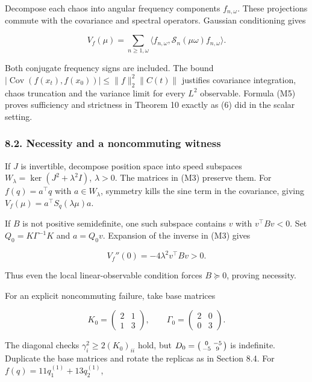 \documentclass[
  british,
  11pt,
  a4paper,
]{article}
\begin{document}
Decompose each chaos into angular frequency components \(f_{n,\omega}\).
These projections commute with the covariance and spectral operators.
Gaussian conditioning gives

\[
V_f(\mu)=\sum_{n\ge1,\omega}
\langle f_{n,\omega},\mathcal S_n(\mu\omega)f_{n,\omega}\rangle. \tag{M5}
\]

Both conjugate frequency signs are included. The bound
\(|\mathop{\mathrm{Cov}}(f(x_t),f(x_0))|\le\|f\|_2^2\|C(t)\|\) justifies
covariance integration, chaos truncation and the variance limit for
every \(L^2\) observable. Formula (M5) proves sufficiency and strictness
in Theorem 10 exactly as (6) did in the scalar setting.

\subsubsection{8.2. Necessity and a noncommuting
witness}\label{necessity-and-a-noncommuting-witness}

If \(J\) is invertible, decompose position space into speed subspaces
\(W_\lambda=\ker(J^2+\lambda^2I)\), \(\lambda>0\). The matrices in (M3)
preserve them. For \(f(q)=a^\top q\) with \(a\in W_\lambda\), symmetry
kills the sine term in the covariance, giving
\(V_f(\mu)=a^\top S_q(\lambda\mu)a\).

If \(B\) is not positive semidefinite, one such subspace contains \(v\)
with \(v^\top Bv<0\). Set \(Q_0=K\Gamma^{-1}K\) and \(a=Q_0v\).
Expansion of the inverse in (M3) gives

\[
V_f''(0)=-4\lambda^2v^\top Bv>0.
\]

Thus even the local linear-observable condition forces \(B\succeq0\),
proving necessity.

For an explicit noncommuting failure, take base matrices

\[
K_0=\begin{pmatrix}2&1\\1&3\end{pmatrix},\qquad
\Gamma_0=\begin{pmatrix}2&0\\0&3\end{pmatrix}.
\]

The diagonal checks \(\gamma_i^2\ge2(K_0)_{ii}\) hold, but
\(D_0=\begin{psmallmatrix}0&-5\\-5&9\end{psmallmatrix}\) is indefinite.
Duplicate the base matrices and rotate the replicas as in Section 8.4.
For \(f(q)=11q^{(1)}_1+13q^{(1)}_2\),
\end{document}

